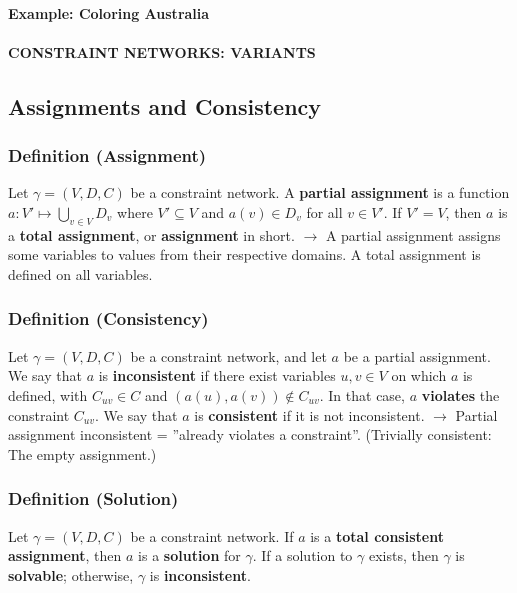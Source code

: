 \documentclass[conference, a4paper]{styles/acmsiggraph}
\newcommand\subsubsubsection{\paragraph}
\begin{document}
            \subsubsubsection{Example: Coloring Australia}
            \subsubsubsection{CONSTRAINT NETWORKS: VARIANTS}
    
    
    
    
    
    
    \subsection{Assignments and Consistency}
        \subsubsection{Definition (Assignment)}
            Let $\gamma = (V,D,C)$ be a constraint network.\newline
            A \textbf{partial assignment} is a function $a : V' \mapsto \bigcup\limits_{v \in V} D_v$ where $V' \subseteq V$ and $a(v) \in D_v$ for all $v \in V'$.\newline
            If $V' = V$, then $a$ is a \textbf{total assignment}, or \textbf{assignment} in short.\newline
            $\rightarrow$ A partial assignment assigns some variables to values from their respective domains.
            A total assignment is defined on all variables.
        
        \subsubsection{Definition (Consistency)}
            Let $\gamma = (V,D,C)$ be a constraint network, and let $a$ be a partial assignment.
            We say that $a$ is \textbf{inconsistent} if there exist variables $u,v \in V$ on which $a$ is defined, with $C_{uv} \in C$ and $(a(u),a(v)) \notin C_{uv}$.
            In that case, $a$ \textbf{violates} the constraint $C_{uv}$.
            We say that $a$ is \textbf{consistent} if it is not inconsistent.\newline
            $\rightarrow$ Partial assignment inconsistent = ''already violates a constraint''. (Trivially consistent: The empty assignment.)
        
        \subsubsection{Definition (Solution)}
            Let $\gamma = (V,D,C)$ be a constraint network. 
            If $a$ is a \textbf{total consistent assignment}, then $a$ is a \textbf{solution} for $\gamma$.
            If a solution to $\gamma$ exists, then $\gamma$ is \textbf{solvable}; otherwise, $\gamma$ is \textbf{inconsistent}.
        
\end{document}
